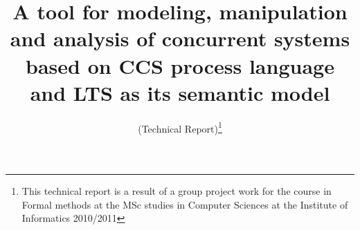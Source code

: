 \documentclass{llncs}
\begin{document}
\mainmatter

%
\pagestyle{plain}
\thispagestyle{plain}

\title{A tool for modeling, manipulation and analysis of concurrent systems based on CCS process language and LTS as its semantic model}
\subtitle{(Technical Report)\footnote{This technical report is a result of a group project work for the course in Formal methods at the MSc studies in Computer Sciences at the Institute of Informatics 2010/2011}}



\maketitle


% 
% 
% 
% 
 
 
 




\end{document}
